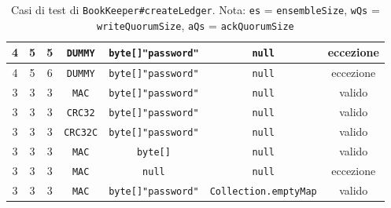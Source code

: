 \documentclass[10pt]{article}
\begin{document}
{\begin{table}[h]
\begin{tabular}{|c|c|c|c|c|c|c|}
				\hline
				4 & 5 & 5 & \texttt{DUMMY} & \texttt{byte[]{"password"}} & \texttt{null} & eccezione \\
				\hline
				4 & 5 & 6 & \texttt{DUMMY} & \texttt{byte[]{"password"}} & \texttt{null} & eccezione \\
				\hline
				3 & 3 & 3 & \texttt{MAC} & \texttt{byte[]{"password"}} & \texttt{null} & valido \\
				\hline
				3 & 3 & 3 & \texttt{CRC32} & \texttt{byte[]{"password"}} & \texttt{null} & valido \\
				\hline
				3 & 3 & 3 & \texttt{CRC32C} & \texttt{byte[]{"password"}} & \texttt{null} & valido \\
				\hline
				3 & 3 & 3 & \texttt{MAC} & \texttt{byte[]{}} & \texttt{null} & valido \\
				\hline
				3 & 3 & 3 & \texttt{MAC} & \texttt{null} & \texttt{null} & eccezione \\
				\hline
				3 & 3 & 3 & \texttt{MAC} & \texttt{byte[]{"password"}} & \texttt{Collection.emptyMap} & valido \\
				\hline
			\end{tabular}
			\caption{Casi di test di \texttt{BookKeeper\#createLedger}. Nota: \texttt{es} = \texttt{ensembleSize}, \texttt{wQs} = \texttt{writeQuorumSize}, \texttt{aQs} = \texttt{ackQuorumSize}}
			\label{tab:test1}
		\end{table}
		
}
\end{document}
